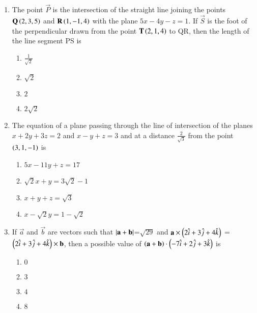 \documentclass[journal,12pt,twocolumn]{IEEEtran}
\theoremstyle{remark}
\begin{document}
\begin{enumerate}
	 \item %
		 The point $\vec{P}$ is the intersection of the straight line joining the points $\mathbf{Q}\left(2,3,5\right)$ and $\mathbf{R}\left(1,-1,4\right)$ with the plane $5x-4y-z=1$. If $\vec{S}$ is the foot of the perpendicular drawn from the point $\mathbf{T}\left(2,1,4\right)$ to QR, then the length of the line segment PS is \hfill{}\\
\begin{enumerate}
	\item $\frac{1}{\sqrt{2}}$           
	\item $\sqrt{2}$                   
        \item $2$           
	\item $2\sqrt{2}$\\ 
\end{enumerate}
\newpage
         \item %
		 The equation of a plane passing through the line of intersection of the planes $x+2y+3z=2$ and $x-y+z=3$ and at a distance $\frac{2}{\sqrt{3}}$ from the point $\left(3,1,-1\right)$ is \hfill{}\\
\begin{enumerate}
        \item $5x-11y+z=17$           
	\item $\sqrt{2}x+y=3\sqrt{2}-1$                   
	\item $x+y+z=\sqrt{3}$           
	\item $x-\sqrt{2}y=1-\sqrt{2}$\\ 
\end{enumerate}

         \item %
		 If $\vec{a}$ and $\vec{b}$ are vectors such that $\left\vert\mathbf{a}+\mathbf{b}\right\vert$=$\sqrt{29}$ and $\mathbf{a}\times\left(2\hat{i}+3\hat{j}+4\hat{k}\right)$ = $\left(2\hat{i}+3\hat{j}+4\hat{k}\right)\times\mathbf{b}$, then a possible value of $\left(\mathbf{a}+\mathbf{b}\right)\cdot\left(-7\hat{i}+2\hat{j}+3\hat{k}\right)$ is \hfill{}\\
\begin{enumerate}
        \item $0$                             
        \item $3$                           
        \item $4$            
        \item $8$\\          
\end{enumerate}


\end{enumerate}
\end{document}
